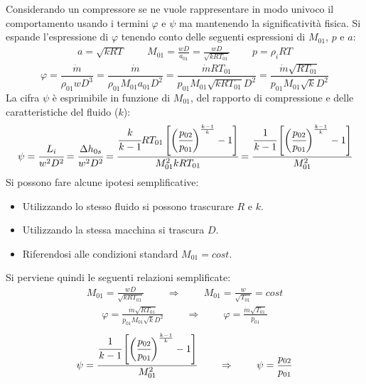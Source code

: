 Considerando un compressore se ne vuole rappresentare in modo univoco il comportamento usando i termini $\varphi$ e $\psi$ ma mantenendo la significatività fisica. Si espande l'espressione di $\varphi$ tenendo conto delle seguenti espressioni di $M_{01}$, $p$ e $a$:
\begin{align*}
a = \sqrt{k R T} \;\;\;\;\;\;\;\; M_{01}=\frac{w D}{a_{01}}= \frac{w D}{\sqrt{k R T_{01}}} \;\;\;\;\;\;\;\; p = \rho_i RT 
\end{align*}
\begin{equation}
\varphi = \frac{\dot{m}}{\rho_{01} w D^3} = \frac{\dot{m}}{\rho_{01} M_{01} a_{01} D^2} = \frac{\dot{m} R T_{01}}{p_{01} M_{01} \sqrt{k R T_{01}} D^2} = \frac{\dot{m} \sqrt{R T_{01}}}{p_{01} M_{01} \sqrt{k} D^2}
\end{equation}
La cifra $\psi$ è esprimibile in funzione di $M_{01}$, del rapporto di compressione e delle caratteristiche del fluido ($k$):
\begin{equation}
\psi = \cfrac{L_i}{w^2 D^2} = \cfrac{\Delta h_{0s}}{w^ 2 D^2} = \cfrac{\cfrac{k}{k-1} R T_{01}\left[ \bigg( \cfrac{p_{02}}{p_{01}} \bigg)^{\frac{k-1}{k}}-1\right]}{M_{01}^2 k R T_{01}} = \cfrac{\cfrac{1}{k-1} \left[ \bigg( \cfrac{p_{02}}{p_{01}} \bigg)^{\frac{k-1}{k}}-1\right]}{M_{01}^2 }
\end{equation}
Si possono fare alcune ipotesi semplificative:
\begin{itemize}
	\item Utilizzando lo stesso fluido si possono trascurare $R$ e $k$.
	\item Utilizzando la stessa macchina si trascura $D$.
	\item Riferendosi alle condizioni standard $M_{01}=cost$.
\end{itemize}
Si perviene quindi le seguenti relazioni semplificate:
\begin{align*}
M_{01}=\frac{w D}{\sqrt{k R T_{01}}} \;\;\;\;\;\;\;\; \Rightarrow \;\;\;\;\;\;\;\; M_{01}=\frac{w}{\sqrt{T_{01}}}=cost
\end{align*}
\begin{align*}
\varphi=\frac{\dot{m} \sqrt{RT_{01}}}{p_{01} M_{01} \sqrt{k}D^2} \;\;\;\;\;\;\;\; \Rightarrow \;\;\;\;\;\;\;\; \varphi=\frac{\dot{m} \sqrt{T_{01}}}{p_{01}}
\end{align*}
\begin{align*}
\psi= \cfrac{\cfrac{1}{k-1} \left[ \bigg( \cfrac{p_{02}}{p_{01}} \bigg)^{\frac{k-1}{k}}-1\right]}{M_{01}^2 } \;\;\;\;\;\;\;\; \Rightarrow \;\;\;\;\;\;\;\; \psi=\frac{p_{02}}{p_{01}}
\end{align*}
